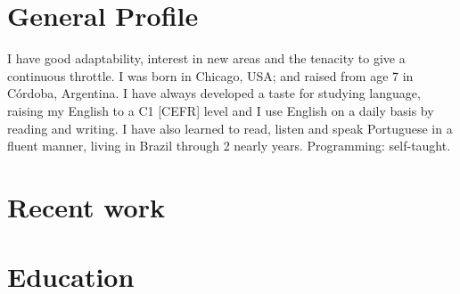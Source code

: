 \documentclass[a4paper,hidelinks]{twentysecondcv} %
\begin{document}
\section{General Profile}

I have good adaptability, interest in new areas and the tenacity to give a continuous throttle. I was born in Chicago, USA; and raised from age 7 in Córdoba, Argentina. I have always developed a taste for studying language, raising my English to a C1 [CEFR] level and I use English on a  daily basis by reading and writing. I have also learned to read, listen and speak Portuguese in a fluent manner, living in Brazil through 2 nearly years. Programming: self-taught.

\section{Recent work}

\begin{twentyshort} %
\end{twentyshort}



\section{Education}
\end{document}
